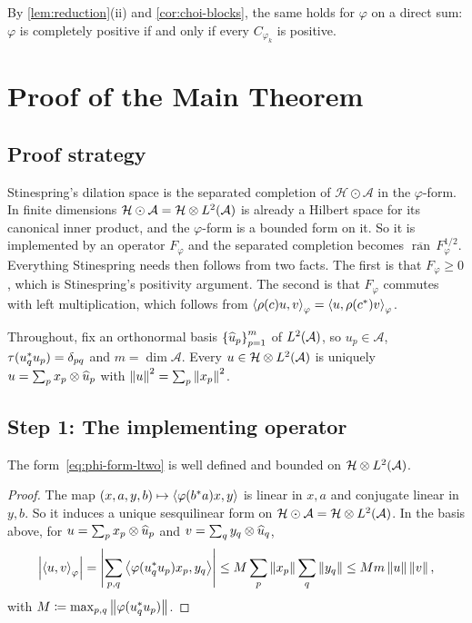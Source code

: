 \documentclass[12pt]{article}
\newcommand{\alg}{\mathcal{A}}             %
\newcommand{\hilb}{\mathcal{H}}            %
\newcommand{\algtensor}{\odot}             %
\newcommand{\ip}[2]{\left\langle #1 , #2 \right\rangle}
\newcommand{\ipphi}[2]{\left\langle #1 , #2 \right\rangle_{\varphi}}
\newcommand{\Ltwo}{L^2\br{\alg}}           %
\newcommand{\vect}[1]{\widehat{#1}}        %
\newcommand{\Ltn}{\hilb \tensor \Ltwo}     %
\newcommand{\Fphi}{F_{\varphi}}            %
\begin{document}
By \cref{lem:reduction}(ii) and \cref{cor:choi-blocks}, the same holds for
\(\varphi\) on a direct sum: \(\varphi\) is completely positive if and only if
every \(C_{\varphi_k}\) is positive.

\section{Proof of the Main Theorem}
\label{sec:proof}

\subsection{Proof strategy}
\label{sec:strategy}

Stinespring's dilation space is the separated completion of \(\hilb \algtensor \alg\)
in the \(\varphi\)-form. In finite dimensions \(\hilb \algtensor \alg = \Ltn\) is
already a Hilbert space for its canonical inner product, and the \(\varphi\)-form is
a bounded form on it. So it is implemented by an operator \(\Fphi\) and the
separated completion becomes \(\overline{\operatorname{ran}}\,\Fphi^{1/2}\).
Everything Stinespring needs then follows from two facts. The first is that
\(\Fphi \ge 0\), which is Stinespring's positivity argument. The second is that
\(\Fphi\) commutes with left multiplication, which follows from
\(\ipphi{\rho(c) u}{v} = \ipphi{u}{\rho(c^\adjoint) v}\).

Throughout, fix an orthonormal basis \(\set{\vect{u}_p}_{p=1}^m\) of \(\Ltwo\), so
\(u_p \in \alg\), \(\tau(u_q^* u_p) = \delta_{pq}\) and \(m = \dim \alg\).
Every \(u \in \Ltn\) is uniquely \(u = \sum_p x_p \tensor \vect{u}_p\) with
\(\left\| u \right\|^2 = \sum_p \left\| x_p \right\|^2\).

\subsection{Step 1: The implementing operator}
\label{sec:step-F}

\begin{lemma}
\label{lem:form-bounded}
The form~\eqref{eq:phi-form-ltwo} is well defined and bounded on \(\Ltn\).
\end{lemma}
\begin{proof}
The map \((x, a, y, b) \mapsto \ip{\varphi(b^\adjoint a)x}{y}\) is linear in
\(x, a\) and conjugate linear in \(y, b\). So it induces a unique sesquilinear form
on \(\hilb \algtensor \alg = \Ltn\). In the basis above, for
\(u = \sum_p x_p \tensor \vect{u}_p\) and \(v = \sum_q y_q \tensor \vect{u}_q\),
\[
  \abs{\ipphi{u}{v}}
  = \abs{\sum_{p,q} \ip{\varphi(u_q^\adjoint u_p) x_p}{y_q}}
  \le M \sum_p \norm{x_p} \sum_q \norm{y_q}
  \le M m \norm{u}\norm{v},
\]
with \(M \coloneqq \max_{p,q}\left\| \varphi(u_q^* u_p) \right\|\).
\end{proof}
\end{document}
